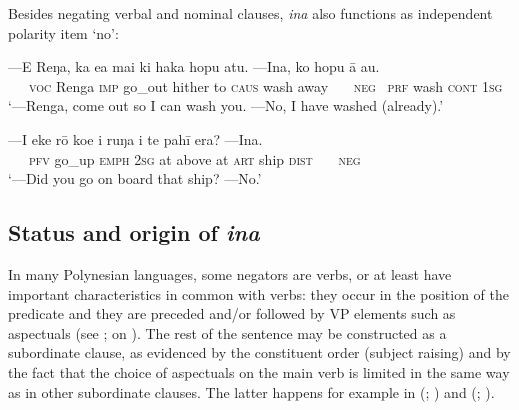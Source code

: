 Besides negating verbal and nominal clauses, \textit{{\ꞌ}ina} also functions as independent polarity item ‘no’:

\ea\label{ex:10.111}
\gll —E Reŋa, ka e{\ꞌ}a mai ki haka hopu atu. —{\ꞌ}Ina, ko hopu {\ꞌ}ā au. \\
~~~\textsc{voc} Renga \textsc{imp} go\_out hither to \textsc{caus} wash away ~~~\textsc{neg}~ \textsc{prf} wash \textsc{cont} \textsc{1sg} \\

\glt 
‘—Renga, come out so I can wash you. —No, I have washed (already).’ \textstyleExampleref{[Mtx-7-15.046]}
\z

\ea\label{ex:10.112}
\gll —I eke rō koe {\ꞌ}i ruŋa i te pahī era? —{\ꞌ}Ina.\\
~~~\textsc{pfv} go\_up \textsc{emph} \textsc{2sg} at above at \textsc{art} ship \textsc{dist} ~~~\textsc{neg}~~\\

\glt 
‘—Did you go on board that ship? —No.’ \textstyleExampleref{[R413.811]}\textstyleExampleref{} 
\z

\subsection{Status and origin of \textit{{\ꞌ}ina}}\label{sec:10.5.2}

In many Polynesian languages, some negators are verbs, or at least have important characteristics in common with verbs: they occur in the position of the predicate and they are preceded and/or followed by VP elements such as aspectuals (see \citealt[209–211]{Payne1985}; \citealt{Broschart1999} on ). The rest of the sentence may be constructed as a subordinate clause, as evidenced by the constituent order (subject raising) and by the fact that the choice of aspectuals on the main verb is limited in the same way as in other subordinate clauses. The latter happens for example in  (\citealt{LazardPeltzer1999}; \citealt[49]{LazardPeltzer2000}) and  (\citealt{Hohepa1969Not}; \citealt[139–141]{Bauer1993}).


